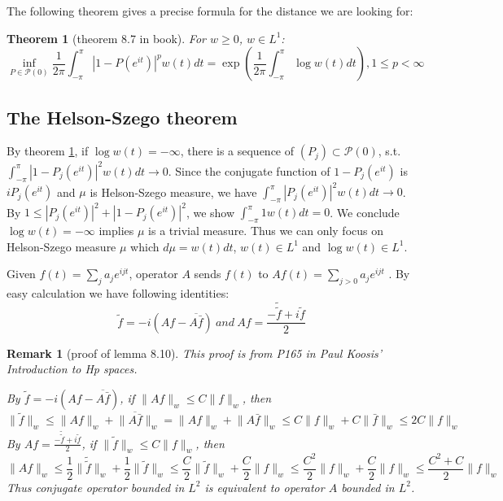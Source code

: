 \documentclass{report}
\newtheorem{remark}{Remark}
\newtheorem{theorem}{Theorem}
\numberwithin{theorem}{subsection}
\numberwithin{remark}{subsection}
\newcommand{\norm}[1]{\lVert#1\rVert}
\newcommand{\abs}[1]{\left\lvert#1\right\rvert}
\begin{document}
The following theorem gives a precise formula for the distance we are looking for:
\begin{theorem}[theorem 8.7 in book]\label{distance from P(0) to 1}
    For $w\geq 0$, $w\in L^1$:
    \begin{equation*}
        \inf_{P\in\mathscr{P}(0)}\frac{1}{2\pi}\int_{-\pi}^{\pi}\abs{1-P(e^{it})}^p w(t)d t=\exp(\frac{1}{2\pi}\int_{-\pi}^{\pi}\log w(t)d t),1\leq p<\infty
    \end{equation*}
\end{theorem}
\subsection{The Helson-Szego theorem}

By theorem \ref{distance from P(0) to 1}, if $\log w(t)=-\infty$,  there is a sequence of $(P_j)\subset\mathscr{P}(0)$, s.t. $\int_{-\pi}^{\pi}\abs{1-P_j(e^{it})}^2 w(t)d t\to 0$. Since the conjugate function of $1-P_j(e^{it})$ is $iP_j(e^{it})$ and $\mu$ is
Helson-Szego measure, we have $\int_{-\pi}^{\pi}\abs{P_j(e^{it})}^2 w(t)d t\to 0$. By $1\leq\abs{P_j(e^{it})}^2+\abs{1-P_j(e^{it})}^2$, we show $\int_{-\pi}^{\pi}1 w(t)d t= 0$. We conclude $\log w(t)=-\infty$ implies $\mu$ is a trivial measure. Thus we can only
focus on Helson-Szego measure $\mu$ which $d\mu=w(t)dt$, $w(t)\in L^1$ and $\log w(t)\in L^1$.\par
Given $f(t)=\sum_j{a_je^{ijt}}$, operator $A$ sends $f(t)$ to $Af(t)=\sum_{j>0}{a_je^{ijt}}$   . By easy calculation we have following identities:
\begin{equation*}
    \tilde{f}=-i(A f-\overline{A\bar{f}})~and~A f=\frac{-\tilde{\tilde{f}}+i\tilde{f}}{2}
\end{equation*}
\begin{remark}[proof of lemma 8.10]

    This proof is from P165 in  Paul Koosis' \emph{Introduction to Hp spaces}.\par
    By $\tilde{f}=-i(Af-\overline{A\bar{f}})$, if $\norm{Af}_w\leq C\norm{f}_w$, then
    \begin{equation*}
        \norm{\tilde{f}}_w\leq \norm{Af}_w+\norm{\overline{A\bar{f}}}_w=\norm{Af}_w+\norm{{A\bar{f}}}_w\leq C\norm{f}_w+C\norm{{\bar{f}}}_w\leq 2C\norm{f}_w
    \end{equation*}
    By $Af=\frac{-\tilde{\tilde{f}}+i\tilde{f}}{2}$, if $\norm{\tilde{f}}_w\leq C\norm{f}_w$, then
    \begin{equation*}
        \norm{Af}_w\leq \frac{1}{2}\norm{\tilde{\tilde{f}}}_w+\frac{1}{2}\norm{\tilde{f}}_w\leq \frac{C}{2}\norm{{\tilde{f}}}_w+\frac{C}{2}\norm{{f}}_w\leq \frac{C^2}{2}\norm{f}_w+\frac{C}{2}\norm{f}_w\leq \frac{C^2+C}{2}\norm{{f}}_w
    \end{equation*}
    Thus conjugate operator bounded in $L^2$ is equivalent to operator $A$ bounded in $L^2$.
\end{remark}
\end{document}
